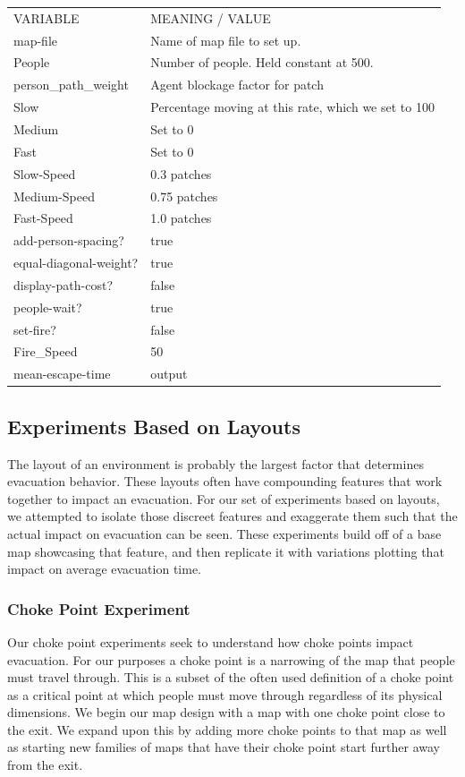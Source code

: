 \documentclass[12pt,letterpaper]{article}
\begin{document}
\begin{tabular}{ l | l }
VARIABLE & MEANING / VALUE \\
map-file & Name of map file to set up. \\
People & Number  of people. Held constant at 500. \\
person\_path\_weight & Agent blockage factor for patch \\
Slow & Percentage moving at this rate, which we set to 100 \\
Medium & Set to 0 \\
Fast & Set to 0 \\
Slow-Speed & 0.3 patches \\
Medium-Speed & 0.75 patches \\
Fast-Speed & 1.0 patches \\
add-person-spacing? & true \\
equal-diagonal-weight? & true \\
display-path-cost? & false \\
people-wait? & true \\
set-fire? & false \\
Fire\_Speed & 50 \\
mean-escape-time & output \\
\end{tabular}

\subsection{Experiments Based on Layouts} \label{expLayout}

The layout of an environment is probably the largest factor that determines evacuation behavior.  These layouts often have compounding features that work together to impact an evacuation\cite{abmEvac}. For our set of experiments based on layouts, we attempted to isolate those discreet features and exaggerate them such that the actual impact on evacuation can be seen.  These experiments build off of a base map showcasing that feature, and then replicate it with variations plotting that impact on average evacuation time.


\subsubsection{Choke Point Experiment} \label{chokepoint}

Our choke point experiments seek to understand how choke points impact evacuation.  For our purposes a choke point is a narrowing of the map that people must travel through.  This is a subset of the often used definition of a choke point as a critical point at which people must move through\cite{evacOptions} regardless of its physical dimensions.  We begin our map design with a map with one choke point close to the exit.  We expand upon this by adding more choke points to that map as well as starting new families of maps that have their choke point start further away from the exit.
\end{document}
